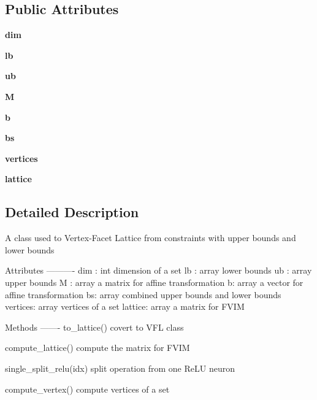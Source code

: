 \subsection*{Public Attributes}
\begin{DoxyCompactItemize}
\item 
\mbox{\label{classcubelattice_1_1cubelattice_a2a9db5c52ad5e50fe41be017d813792b}} 
{\bfseries dim}
\item 
\mbox{\label{classcubelattice_1_1cubelattice_af9e79130116c4aab748236257323525e}} 
{\bfseries lb}
\item 
\mbox{\label{classcubelattice_1_1cubelattice_a089f369e0885c11355a97f380f7947d5}} 
{\bfseries ub}
\item 
\mbox{\label{classcubelattice_1_1cubelattice_a50ea98e473f9b332e71463bfbe630c07}} 
{\bfseries M}
\item 
\mbox{\label{classcubelattice_1_1cubelattice_a9c6005cf860ad675b1ee6add755ba665}} 
{\bfseries b}
\item 
\mbox{\label{classcubelattice_1_1cubelattice_a1ad330ec072f3d78e6cf5f0f7e0cf33c}} 
{\bfseries bs}
\item 
\mbox{\label{classcubelattice_1_1cubelattice_ae08aaa5f051ee3f2142958795a04458d}} 
{\bfseries vertices}
\item 
\mbox{\label{classcubelattice_1_1cubelattice_af16e3c6ccb09126b4db91232af5021cc}} 
{\bfseries lattice}
\end{DoxyCompactItemize}


\subsection{Detailed Description}
\begin{DoxyVerb}A class used to Vertex-Facet Lattice from constraints with upper bounds and lower bounds

Attributes
----------
dim : int
    dimension of a set
lb : array
    lower bounds
ub : array
    upper bounds
M : array
    a matrix for affine transformation
b: array
    a vector for affine transformation
bs: array
    combined upper bounds and lower bounds
vertices: array
    vertices of a set
lattice: array
    a matrix for FVIM


Methods
-------
to_lattice()
    covert to VFL class

compute_lattice()
    compute the matrix for FVIM

single_split_relu(idx)
    split operation from one ReLU neuron

compute_vertex()
    compute vertices of a set
\end{DoxyVerb}
 

